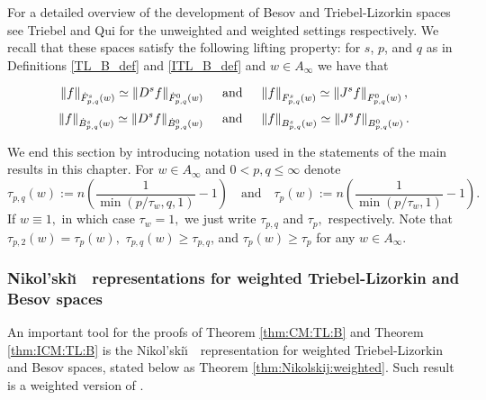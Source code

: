 For a detailed overview of the development of Besov and Triebel-Lizorkin spaces see Triebel \cite{MR3024598} and Qui \cite{MR676560} for the unweighted and weighted settings respectively. We recall that these spaces satisfy the following lifting property: for $s$, $p$, and $q$ as in Definitions \ref{TL_B_def} and \ref{ITL_B_def} and $w\in A_\infty$ we have that 

 \begin{equation}\label{lifting_TL}
  \norm{f}{\tlw{p}{s}{q}{w}}\simeq\norm{D^s f}{\tlw{p}{0}{q}{w}} \quad \text{ and } \quad \norm{f}{\itlw{p}{s}{q}{w}}\simeq\norm{J^s f}{\itlw{p}{0}{q}{w}},
 \end{equation}
 \begin{equation}\label{lifting_B}
  \norm{f}{\besw{p}{s}{q}{w}}\simeq\norm{D^s f}{\besw{p}{0}{q}{w}} \quad \text{ and } \quad \norm{f}{\ibesw{p}{s}{q}{w}}\simeq\norm{J^s f}{\ibesw{p}{0}{q}{w}}.
 \end{equation}
 

We end this section by introducing notation used in the statements of the main results in this chapter. For $w\in A_\infty$ and  $0<p,q\le \infty$  denote 
\begin{equation}\label{def:tau_pq(w)}
\tau_{p,q}(w) := n \left(\frac{1}{\min(p/\tau_w,q,1)} - 1 \right)  \quad \text{and}\quad \tau_{p}(w):=n\left(\frac{1}{\min(p/\tau_w,1)}-1\right).
\end{equation} 
If $w\equiv 1,$ in which case $\tau_w=1,$ we just write $\tau_{p,q}$  and $\tau_p,$ respectively. Note  that $\tau_{p,2}(w)=\tau_p(w),$ $\tau_{p,q}(w)\ge \tau_{p,q}$, and $\tau_p(w)\ge \tau_p$ for any $w\in A_\infty.$

\subsubsection{Nikol'ski\u\i$\text{ }$ representations for weighted Triebel-Lizorkin and Besov spaces}

An important tool for the proofs of Theorem \ref{thm:CM:TL:B} and Theorem \ref{thm:ICM:TL:B} is the Nikol'ski\u\i$\text{ }$ representation for weighted Triebel-Lizorkin and Besov spaces, stated below as Theorem \ref{thm:Nikolskij:weighted}. Such result is a weighted version of \cite[Theorem 3.7]{MR837335}. 

